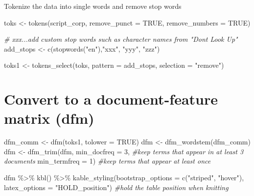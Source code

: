 \documentclass[
]{article}
\newenvironment{Shaded}{\begin{snugshade}}{\end{snugshade}}
\newcommand{\AttributeTok}[1]{\textcolor[rgb]{0.77,0.63,0.00}{#1}}
\newcommand{\CommentTok}[1]{\textcolor[rgb]{0.56,0.35,0.01}{\textit{#1}}}
\newcommand{\ConstantTok}[1]{\textcolor[rgb]{0.00,0.00,0.00}{#1}}
\newcommand{\DecValTok}[1]{\textcolor[rgb]{0.00,0.00,0.81}{#1}}
\newcommand{\FunctionTok}[1]{\textcolor[rgb]{0.00,0.00,0.00}{#1}}
\newcommand{\NormalTok}[1]{#1}
\newcommand{\OtherTok}[1]{\textcolor[rgb]{0.56,0.35,0.01}{#1}}
\newcommand{\SpecialCharTok}[1]{\textcolor[rgb]{0.00,0.00,0.00}{#1}}
\newcommand{\StringTok}[1]{\textcolor[rgb]{0.31,0.60,0.02}{#1}}
\begin{document}
Tokenize the data into single words and remove stop words

\begin{Shaded}
\begin{Highlighting}[]
\NormalTok{toks }\OtherTok{\textless{}{-}} \FunctionTok{tokens}\NormalTok{(script\_corp, }
               \AttributeTok{remove\_punct =} \ConstantTok{TRUE}\NormalTok{, }
               \AttributeTok{remove\_numbers =} \ConstantTok{TRUE}\NormalTok{)}

\CommentTok{\# xxx...add custom stop words such as character names from "Don\textquotesingle{}t Look Up"}
\NormalTok{add\_stops }\OtherTok{\textless{}{-}} \FunctionTok{c}\NormalTok{(}\FunctionTok{stopwords}\NormalTok{(}\StringTok{"en"}\NormalTok{),}\StringTok{"xxx"}\NormalTok{, }\StringTok{"yyy"}\NormalTok{, }\StringTok{"zzz"}\NormalTok{)}

\NormalTok{toks1 }\OtherTok{\textless{}{-}} \FunctionTok{tokens\_select}\NormalTok{(toks, }\AttributeTok{pattern =}\NormalTok{ add\_stops, }\AttributeTok{selection =} \StringTok{"remove"}\NormalTok{)}
\end{Highlighting}
\end{Shaded}

\hypertarget{convert-to-a-document-feature-matrix-dfm}{%
\section{Convert to a document-feature matrix
(dfm)}\label{convert-to-a-document-feature-matrix-dfm}}

\begin{Shaded}
\begin{Highlighting}[]
\NormalTok{dfm\_comm }\OtherTok{\textless{}{-}} \FunctionTok{dfm}\NormalTok{(toks1, }\AttributeTok{tolower =} \ConstantTok{TRUE}\NormalTok{)}
\NormalTok{dfm }\OtherTok{\textless{}{-}} \FunctionTok{dfm\_wordstem}\NormalTok{(dfm\_comm)}
\NormalTok{dfm }\OtherTok{\textless{}{-}} \FunctionTok{dfm\_trim}\NormalTok{(dfm, }
                \AttributeTok{min\_docfreq =} \DecValTok{3}\NormalTok{, }\CommentTok{\#keep terms that appear in at least 3 documents }
                \AttributeTok{min\_termfreq =} \DecValTok{1}\NormalTok{) }\CommentTok{\#keep terms that appear at least once}

\NormalTok{dfm }\SpecialCharTok{\%\textgreater{}\%} 
  \FunctionTok{kbl}\NormalTok{() }\SpecialCharTok{\%\textgreater{}\%} 
  \FunctionTok{kable\_styling}\NormalTok{(}\AttributeTok{bootstrap\_options =} \FunctionTok{c}\NormalTok{(}\StringTok{"striped"}\NormalTok{, }\StringTok{"hover"}\NormalTok{),}
                \AttributeTok{latex\_options =} \StringTok{"HOLD\_position"}\NormalTok{) }\CommentTok{\#hold the table position when knitting}
\end{Highlighting}
\end{Shaded}
\end{document}
